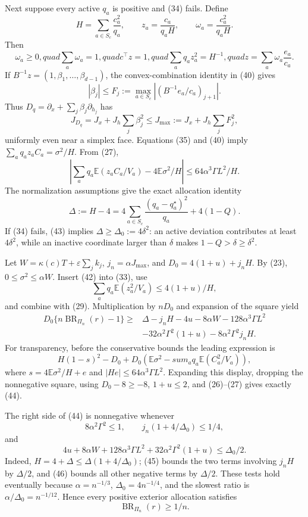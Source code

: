 Next suppose every active \(q_a\) is positive and (34) fails.  Define
\[
H=\sum_{a\in S_c}\frac{c_a^2}{q_a},
\qquad
z_a=\frac{c_a}{q_aH},
\qquad
\omega_a=\frac{c_a^2}{q_aH}.
\]
Then
\[
\omega_a\ge0,quad \sum_a\omega_a=1,quad c^\top z=1,quad
\sum_aq_az_a^2=H^{-1},quad
z=\sum_a\omega_a\frac{e_a}{c_a}.
\tag{40}
\]
If \(B^{-1}z=(1,\beta_1,\ldots,\beta_{d-1})\), the convex-combination identity in (40) gives
\[
|\beta_j|\le F_j:=\max_{a\in S_c}
\left|\left(B^{-1}e_a/c_a\right)_{j+1}\right|.
\]
Thus \(D_q=\partial_x+\sum_j\beta_j\partial_{h_j}\) has
\[
J_{D_q}=J_x+J_h\sum_j\beta_j^2
\le J_{\max}:=J_x+J_h\sum_jF_j^2,
\tag{41}
\]
uniformly even near a simplex face.  Equations (35) and (40) imply \(\sum_aq_az_aC_a=\sigma^2/H\).  From (27),
\[
\left|\sum_aq_a\mathbb E(z_aC_a/V_a)-4\mathbb E\sigma^2/H\right|
\le64\alpha^3\Gamma L^2/H.
\tag{42}
\]
The normalization assumptions give the exact allocation identity
\[
\Delta:=H-4
=4\sum_{a\in S_c}\frac{(q_a-q_a^\star)^2}{q_a}+4(1-Q).
\tag{43}
\]
If (34) fails, (43) implies \(\Delta\ge\Delta_0:=4\delta^2\): an active deviation contributes at least \(4\delta^2\), while an inactive coordinate larger than \(\delta\) makes \(1-Q>\delta\ge\delta^2\).

Let \(W=\kappa(c)T+\varepsilon\sum_jk_j\), \(j_n=\alpha J_{\max}\), and \(D_0=4(1+u)+j_nH\).  By (23), \(0\le\sigma^2\le\alpha W\).  Insert (42) into (33), use
\[
\sum_aq_a\mathbb E(z_a^2/V_a)\le4(1+u)/H,
\]
and combine with (29).  Multiplication by \(nD_0\) and expansion of the square yield
\[
\begin{split}
D_0\{n\operatorname{BR}_{\Pi_n}(r)-1\}\ge{}&
\Delta-j_nH-4u-8\alpha W-128\alpha^3\Gamma L^2\\
&-32\alpha^2\Gamma^2(1+u)-8\alpha^2\Gamma^2j_nH.
\end{split}
\tag{44}
\]
For transparency, before the conservative bounds the leading expression is
\[
H(1-s)^2-D_0+D_0\left(\mathbb E\sigma^2-sum_aq_a\mathbb E(C_a^2/V_a)\right),
\]
where \(s=4\mathbb E\sigma^2/H+e\) and \(|He|\le64\alpha^3\Gamma L^2\).  Expanding this display, dropping the nonnegative square, using \(D_0-8\ge-8\), \(1+u\le2\), and (26)--(27) gives exactly (44).

The right side of (44) is nonnegative whenever
\[
8\alpha^2\Gamma^2\le1,
\qquad
j_n(1+4/\Delta_0)\le1/4,
\tag{45}
\]
and
\[
4u+8\alpha W+128\alpha^3\Gamma L^2
+32\alpha^2\Gamma^2(1+u)\le\Delta_0/2.
\tag{46}
\]
Indeed, \(H=4+\Delta\le\Delta(1+4/\Delta_0)\); (45) bounds the two terms involving \(j_nH\) by \(\Delta/2\), and (46) bounds all other negative terms by \(\Delta/2\).  These tests hold eventually because \(\alpha=n^{-1/3}\), \(\Delta_0=4n^{-1/4}\), and the slowest ratio is \(\alpha/\Delta_0=n^{-1/12}\).  Hence every positive exterior allocation satisfies
\[
\operatorname{BR}_{\Pi_n}(r)\ge1/n.
\tag{47}
\]

